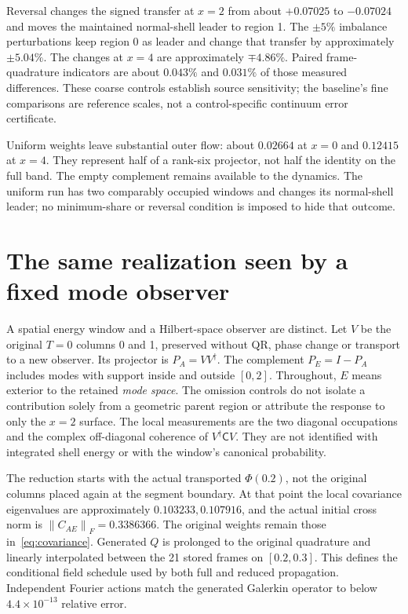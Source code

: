 \documentclass[11pt]{article}
\newcommand{\norm}[1]{\left\lVert#1\right\rVert}
\newcommand{\Cov}{\mathsf C}
\begin{document}
Reversal changes the signed transfer at $x=2$ from about $+0.07025$ to
$-0.07024$ and moves the maintained normal-shell leader to region 1.
The $\pm5\%$ imbalance perturbations keep region 0 as leader and change
that transfer by approximately $\pm5.04\%$. The changes at $x=4$ are
approximately $\mp4.86\%$. Paired frame-quadrature indicators are about
$0.043\%$ and $0.031\%$ of those measured differences.
These coarse controls establish source sensitivity; the baseline's fine
comparisons are reference scales, not a control-specific continuum error
certificate.

Uniform weights leave substantial outer flow: about $0.02664$ at $x=0$
and $0.12415$ at $x=4$. They represent half of a rank-six projector,
not half the identity on the full band. The empty complement remains
available to the dynamics. The uniform run has two comparably occupied
windows and changes its normal-shell leader; no minimum-share or reversal
condition is imposed to hide that outcome.

\section{The same realization seen by a fixed mode observer}\label{sec:local}
A spatial energy window and a Hilbert-space observer are distinct.
Let $V$ be the original $T=0$ columns 0 and 1, preserved without QR,
phase change or transport to a new observer. Its projector is $P_A=VV^\dagger$.
The complement $P_E=I-P_A$ includes modes with support inside and outside
$[0,2]$. Throughout, $E$ means exterior to the retained \emph{mode space}.
The omission controls do not isolate a contribution solely from a geometric
parent region or attribute the response to only the $x=2$ surface.
The local measurements are the two diagonal occupations and the
complex off-diagonal coherence of $V^\dagger\Cov V$.
They are not identified with integrated shell energy or with the window's
canonical probability.

The reduction starts with the actual transported $\Phi(0.2)$,
not the original columns placed again at the segment boundary.
At that point the local covariance eigenvalues are approximately
$0.103233,0.107916$, and the actual initial cross norm is
$\norm{C_{AE}}_F=0.3386366$.
The original weights remain those in~\eqref{eq:covariance}.
Generated $Q$ is prolonged to the original quadrature and linearly
interpolated between the 21 stored frames on $[0.2,0.3]$.
This defines the conditional field schedule used by both full and reduced
propagation. Independent Fourier actions match the generated Galerkin
operator to below $4.4\times10^{-13}$ relative error.
\end{document}
